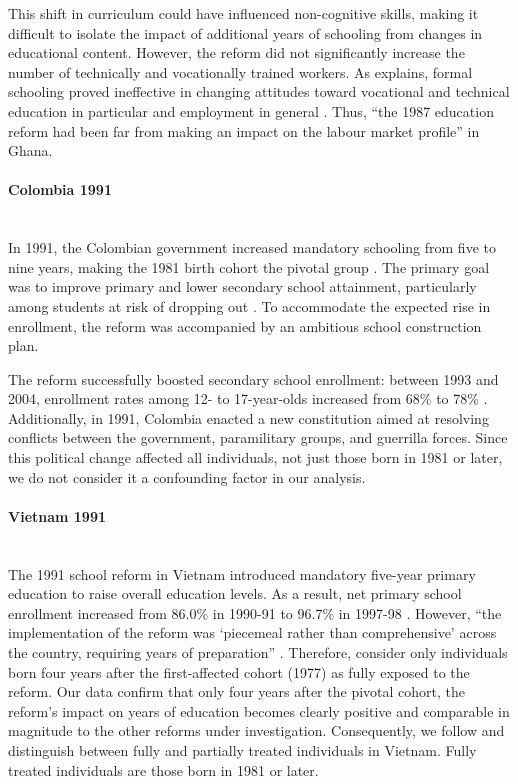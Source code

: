 This shift in curriculum could have influenced non-cognitive skills, making it difficult to isolate the impact of additional years of schooling from changes in educational content. However, the reform did not significantly increase the number of technically and vocationally trained workers. As \citet{akyeampong_educational_2007} explains, formal schooling proved ineffective in changing attitudes toward vocational and technical education in particular and employment in general \parencite{foster_education_1965, king_vocational_2002}. Thus, ``the 1987 education reform had been far from making an impact on the labour market profile'' \parencite[][p.~6]{akyeampong_educational_2007} in Ghana.


\paragraph{Colombia 1991} \label{sec:colombia} \mbox{}\\
In 1991, the Colombian government increased mandatory schooling from five to nine years, making the 1981 birth cohort the pivotal group \parencite{urbina_mass_2022}. The primary goal was to improve primary and lower secondary school attainment, particularly among students at risk of dropping out \parencite{unesco_situacion_2001}. To accommodate the expected rise in enrollment, the reform was accompanied by an ambitious school construction plan.

The reform successfully boosted secondary school enrollment: between 1993 and 2004, enrollment rates among 12- to 17-year-olds increased from 68\% to 78\% \parencite{urbina_mass_2022, unesco_educacion_2004}. Additionally, in 1991, Colombia enacted a new constitution aimed at resolving conflicts between the government, paramilitary groups, and guerrilla forces. Since this political change affected all individuals, not just those born in 1981 or later, we do not consider it a confounding factor in our analysis.

\paragraph{Vietnam 1991} \label{sec:vietnam} \mbox{}\\
The 1991 school reform in Vietnam introduced mandatory five-year primary education to raise overall education levels. As a result, net primary school enrollment increased from 86.0\% in 1990-91 to 96.7\% in 1997-98 \parencite{national_committee_for_efa_assessment_assessment_1999}. However, ``the implementation of the reform was `piecemeal rather than comprehensive' across the country, requiring years of preparation'' \parencite[][p. 3]{cornelissen_multigenerational_2022}. Therefore, \citet{cornelissen_multigenerational_2022} consider only individuals born four years after the first-affected cohort (1977) as fully exposed to the reform. Our data confirm that only four years after the pivotal cohort, the reform's impact on years of education becomes clearly positive and comparable in magnitude to the other reforms under investigation. Consequently, we follow \citet{cornelissen_multigenerational_2022} and distinguish between fully and partially treated individuals in Vietnam. Fully treated individuals are those born in 1981 or later.

